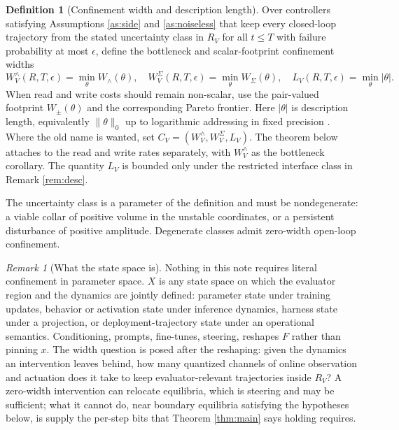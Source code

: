 \documentclass[11pt]{article}
\theoremstyle{definition}
\newtheorem{definition}{Definition}[section]
\theoremstyle{remark}
\newtheorem{remark}{Remark}[section]
\newcommand{\RV}{R_V}
\newcommand{\W}{W}
\begin{document}
\begin{definition}[Confinement width and description length]\label{def:width}
Over controllers satisfying Assumptions \ref{as:side} and \ref{as:noiseless} that keep every closed-loop trajectory from the stated uncertainty class in $\RV$ for all $t\le T$ with failure probability at most $\epsilon$, define the bottleneck and scalar-footprint confinement widths
\begin{equation}
\W^\wedge_V(R,T,\epsilon)=\min_\theta \W_\wedge(\theta),\quad \W^\Sigma_V(R,T,\epsilon)=\min_\theta \W_\Sigma(\theta),\quad L_V(R,T,\epsilon)=\min_\theta|\theta|. \label{eq:defwidth}
\end{equation}
When read and write costs should remain non-scalar, use the pair-valued footprint $\W_\pm(\theta)$ and the corresponding Pareto frontier. Here $|\theta|$ is description length, equivalently $\|\theta\|_0$ up to logarithmic addressing in fixed precision \cite{musat2026}. Where the old name is wanted, set $C_V=(\W^\wedge_V,\W^\Sigma_V,L_V)$. The theorem below attaches to the read and write rates separately, with $\W^\wedge_V$ as the bottleneck corollary. The quantity $L_V$ is bounded only under the restricted interface class in Remark \ref{rem:desc}.
\end{definition}

The uncertainty class is a parameter of the definition and must be nondegenerate: a viable collar of positive volume in the unstable coordinates, or a persistent disturbance of positive amplitude. Degenerate classes admit zero-width open-loop confinement.

\begin{remark}[What the state space is]\label{rem:state}
Nothing in this note requires literal confinement in parameter space. $X$ is any state space on which the evaluator region and the dynamics are jointly defined: parameter state under training updates, behavior or activation state under inference dynamics, harness state under a projection, or deployment-trajectory state under an operational semantics. Conditioning, prompts, fine-tunes, steering, reshapes $F$ rather than pinning $x$. The width question is posed after the reshaping: given the dynamics an intervention leaves behind, how many quantized channels of online observation and actuation does it take to keep evaluator-relevant trajectories inside $\RV$? A zero-width intervention can relocate equilibria, which is steering and may be sufficient; what it cannot do, near boundary equilibria satisfying the hypotheses below, is supply the per-step bits that Theorem \ref{thm:main} says holding requires.
\end{remark}
\end{document}
